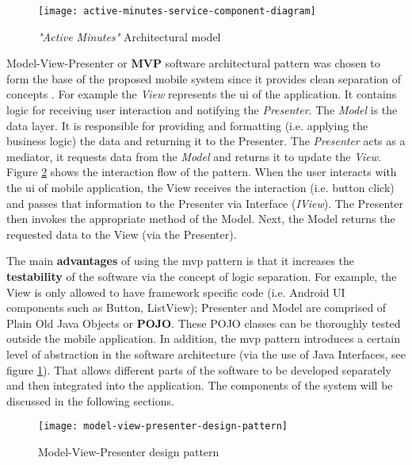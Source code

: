     \begin{figure}[H]
        \centering
        \texttt{[image: active-minutes-service-component-diagram]}
        \caption{ \textit{"Active Minutes"} Architectural model}
        \label{fig:architectural_design_component_diagram}
    \end{figure}
    
    Model-View-Presenter or \textbf{MVP} software architectural pattern was chosen to form the base of the proposed mobile system since it provides clean separation of concepts \citep[532]{zhang2010}. For example the \textit{View} represents the \gls{ui} of the application. It contains logic for receiving user interaction and notifying the \textit{Presenter}. The \textit{Model} is the data layer. It is responsible for providing and formatting (i.e. applying the business logic) the data and returning it to the Presenter. The \textit{Presenter} acts as a mediator, it requests data from the \textit{Model} and returns it to update the \textit{View}. Figure \ref{fig:model_view_presenter_design_pattern} shows the interaction flow of the pattern. When the user interacts with the \gls{ui} of mobile application, the View receives the interaction (i.e. button click) and passes that information to the Presenter via Interface (\textit{IView}). The Presenter then invokes the appropriate method of the Model. Next, the Model returns the requested data to the View (via the Presenter). 
        
    The main \textbf{advantages} of using the \gls{mvp} pattern is that it increases the \textbf{testability} of the software via the concept of logic separation. For example, the View is only allowed to have framework specific code (i.e. Android UI components such as Button, ListView); Presenter and Model are comprised of Plain Old Java Objects or \textbf{POJO}. These POJO classes can be thoroughly tested outside the mobile application. In addition, the \gls{mvp} pattern introduces a certain level of abstraction in the software architecture (via the use of Java Interfaces, see figure \ref{fig:architectural_design_component_diagram}). That allows different parts of the software to be developed separately and then integrated into the application. The components of the system will be discussed in the following sections.
    
    \begin{figure}[ht]
        \centering
        \texttt{[image: model-view-presenter-design-pattern]}
        \caption{Model-View-Presenter design pattern \citep[28]{syromiatnikov2014}}
        \label{fig:model_view_presenter_design_pattern}
    \end{figure}
        
